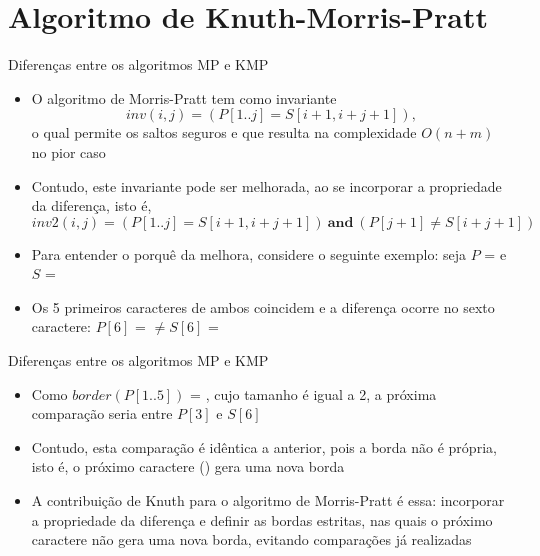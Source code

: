 \section{Algoritmo de Knuth-Morris-Pratt}


\begin{frame}[fragile]{Diferenças entre os algoritmos MP e KMP}

    \begin{itemize}
        \item O algoritmo de Morris-Pratt tem como invariante
        \[
            inv(i, j) = (P[1..j] = S[i + 1, i + j + 1]),
        \]
        o qual permite os saltos seguros e que resulta na complexidade $O(n + m)$ no pior caso

        \item Contudo, este invariante pode ser melhorada, ao se incorporar a propriedade da 
        diferença, isto é,
        \[
            inv2(i, j) = (P[1..j] = S[i + 1, i + j + 1])\ \mathbf{and}\ (P[j + 1] \neq S[i + j + 1])
        \]

        \item Para entender o porquê da melhora, considere o seguinte exemplo: seja 
            $P$ =  e $S$ = 

        \item Os 5 primeiros caracteres de ambos coincidem e a diferença ocorre no sexto 
            caractere: $P[6]$ =  $\neq S[6]$ = 

    \end{itemize}

\end{frame}

\begin{frame}[fragile]{Diferenças entre os algoritmos MP e KMP}

    \begin{itemize}
        \item Como $border(P[1..5])$ = , cujo tamanho é igual a 2, a próxima 
            comparação seria entre $P[3]$ e $S[6]$

        \item Contudo, esta comparação é idêntica a anterior, pois a borda  não é 
            própria, isto é, o próximo caractere () gera uma nova borda 

        \item A contribuição de Knuth para o algoritmo de Morris-Pratt é essa: incorporar a 
            propriedade da diferença e definir as bordas estritas, nas quais o próximo caractere 
            não gera uma nova borda, evitando comparações já realizadas
    \end{itemize}

\end{frame}



